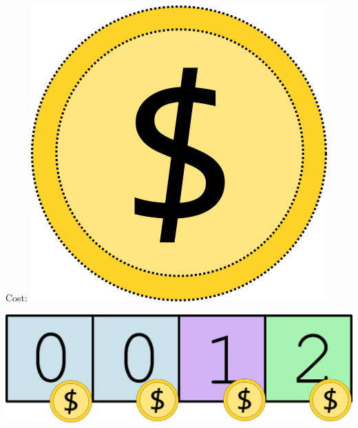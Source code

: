 \documentclass[aspectratio=169]{beamer}
\begin{document}
\begin{frame}[fragile]
  \hspace{10em} Cost:
  \includegraphics[height=.15\textheight]{amortizedgfx/coin_01.png}
  \begin{center}
    \includegraphics[width=.5\textwidth]{amortizedgfx/push_coin_002.png}
  \end{center}
  
\end{frame}
\end{document}

